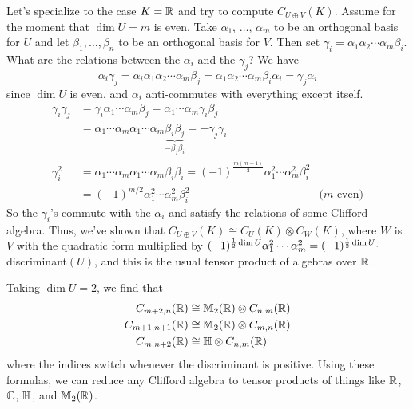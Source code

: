  \smallskip
 Let's specialize to the case $K=\mathbb{R}$ and try to compute $C_{U\oplus V}(K)$. Assume for
 the moment that $\dim U=m$ is even. Take $\alpha_1$, $\dots$, $\alpha_m$ to be
 an orthogonal basis for $U$ and let $\beta_1,\dots, \beta_n$ to be an orthogonal basis
 for $V$. Then set $\gamma_i = \alpha_1\alpha_2\cdots \alpha_m \beta_i$. What are the
 relations between the $\alpha_i$ and the $\gamma_j$? We have
 \[
   \alpha_i\gamma_j = \alpha_i \alpha_1\alpha_2\cdots \alpha_m \beta_j
   = \alpha_1\alpha_2\cdots \alpha_m \beta_i \alpha_i = \gamma_j\alpha_i
 \]
 since $\dim U$ is even, and $\alpha_i$ anti-commutes with everything except itself.
 \begin{align*}
    \gamma_i\gamma_j &= \gamma_i\alpha_1\cdots \alpha_m \beta_j
    = \alpha_1\cdots \alpha_m \gamma_i \beta_j\\
    &= \alpha_1\cdots \alpha_m \alpha_1\cdots \alpha_m \underbrace{\beta_i \beta_j}_{-\beta_j\beta_i}
    = -\gamma_j\gamma_i\\
  \gamma_i^2 &= \alpha_1\cdots \alpha_m\alpha_1\cdots \alpha_m \beta_i \beta_i
    = (-1)^{\frac{m(m-1)}{2}} \alpha_1^2\cdots \alpha_m^2 \beta_i^2 \\
    &= (-1)^{m/2} \alpha_1^2\cdots \alpha_m^2 \beta_i^2 & \text{($m$ even)}
 \end{align*}
 So the $\gamma_i$'s commute with the $\alpha_i$ and satisfy the relations of some
 Clifford algebra. Thus, we've shown that $C_{U\oplus V} (K) \cong C_U(K)\otimes C_W(K)$,
 where $W$ is $V$ with the quadratic form multiplied by $(-1)^{\frac{1}{2}\dim U}\alpha_1^2
 \cdots \alpha_m^2 = (-1)^{\frac{1}{2}\dim U}\cdot\,$discriminant$(U)$, and this is the usual
 tensor product of algebras over $\mathbb{R}$.

 Taking $\dim U=2$, we find that
 \begin{align*}
   C_{m+2,n}(\mathbb{R}) &\cong \mathbb{M}_2(\mathbb{R})\otimes C_{n,m}(\mathbb{R})\\
   C_{m+1,n+1}(\mathbb{R}) &\cong \mathbb{M}_2(\mathbb{R}) \otimes C_{m,n}(\mathbb{R})\\
   C_{m,n+2}(\mathbb{R}) &\cong \mathbb{H}\otimes C_{n,m}(\mathbb{R})
 \end{align*}
 where the indices switch whenever the discriminant is positive. Using these formulas, we
 can reduce any Clifford algebra to tensor products of things like $\mathbb{R}$, $\mathbb{C}$, $\mathbb{H}$,
 and $\mathbb{M}_2(\mathbb{R})$.

